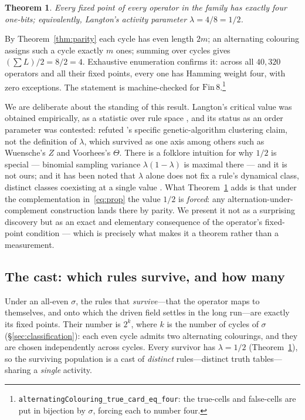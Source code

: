 \documentclass[man,12pt,floatsintext]{apa7}
\newcommand{\sig}{\sigma}
\newtheorem{theorem}{Theorem}
\begin{document}
\begin{theorem}\label{thm:lambda}
Every fixed point of every operator in the family has exactly four one-bits;
equivalently, Langton's activity parameter $\lambda = 4/8 = 1/2$.
\end{theorem}

\noindent By Theorem~\ref{thm:parity} each cycle has even length $2m$; an
alternating colouring assigns such a cycle exactly $m$ ones; summing over
cycles gives $(\sum L)/2 = 8/2 = 4$. Exhaustive enumeration confirms it:
across all $40{,}320$ operators and all their fixed points, every one has
Hamming weight four, with zero exceptions. The statement is machine-checked
for $\mathrm{Fin}\,8$.\footnote{%
\texttt{alternatingColouring\_true\_card\_eq\_four}: the true-cells and
false-cells are put in bijection by $\sig$, forcing each to number four.}

We are deliberate about the standing of this result. Langton's critical
value was obtained empirically, as a statistic over rule space
\parencite{langton1990computation}, and its status as an order parameter
was contested: \textcite{mitchell1993revisiting} refuted
\textcite{packard1988adaptation}'s specific genetic-algorithm clustering
claim, not the definition of $\lambda$, which survived as one axis among
others such as Wuensche's $Z$ \parencite{wuensche1999classifying} and
Voorhees's $\Theta$. There is a folklore intuition for why $1/2$
is special --- binomial sampling variance $\lambda(1-\lambda)$ is maximal
there --- and it is not ours; and it has been noted that $\lambda$ alone
does not fix a rule's dynamical class, distinct classes coexisting at a
single value \parencite{sakai2002edge}. What
Theorem~\ref{thm:lambda} adds is that under the complementation
in~\eqref{eq:prop} the value $1/2$ is \emph{forced}: any
alternation-under-complement construction lands there by parity. We present
it not as a surprising discovery but as an exact and elementary consequence
of the operator's fixed-point condition --- which is precisely what makes
it a theorem rather than a measurement.

\subsection{The cast: which rules survive, and how many}

Under an all-even $\sig$, the rules that \emph{survive}---that the operator
maps to themselves, and onto which the driven field settles in the long
run---are exactly its fixed points. Their number is $2^k$, where $k$ is the
number of cycles of $\sig$ (\S\ref{sec:classification}): each even cycle
admits two alternating colourings, and they are chosen independently across
cycles. Every survivor has $\lambda = 1/2$ (Theorem~\ref{thm:lambda}), so
the surviving population is a cast of \emph{distinct} rules---distinct truth
tables---sharing a \emph{single} activity.
\end{document}
